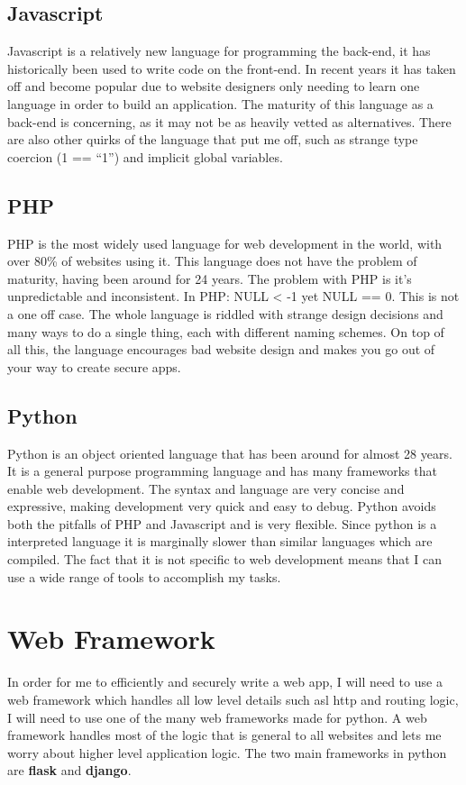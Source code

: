 \documentclass[12pt, draft]{report}
\begin{document}
	\subsection{Javascript}
	Javascript is a relatively new language for programming the back-end, it has historically been used to write code on the front-end. In recent years it has taken off and become popular due to website designers only needing to learn one language in order to build an application. The maturity of this language as a back-end is concerning, as it may not be as heavily vetted as alternatives. There are also other quirks of the language that put me off, such as strange type coercion (1 == “1”) and implicit global variables.

	\subsection{PHP}
	PHP is the most widely used language for web development in the world, with over 80\% of websites using it. This language does not have the problem of maturity, having been around for 24 years. The problem with PHP is it’s unpredictable and inconsistent. In PHP: NULL < -1 yet NULL == 0. This is not a one off case. The whole language is riddled with strange design decisions and many ways to do a single thing, each with different naming schemes. On top of all this, the language encourages bad website design and makes you go out of your way to create secure apps.

	\subsection{Python}
	Python is an object oriented language that has been around for almost 28 years. It is a general purpose programming language and has many frameworks that enable web development. The syntax and language are very concise and expressive, making development very quick and easy to debug. Python avoids both the pitfalls of PHP and Javascript and is very flexible. Since python is a interpreted language it is marginally slower than similar languages which are compiled. The fact that it is not specific to web development means that I can use a wide range of tools to accomplish my tasks.

	\section{Web Framework}
	In order for me to efficiently and securely write a web app, I will need to use a web framework which handles all low level details such asl http and routing logic, I will need to use one of the many web frameworks made for python. A web framework handles most of the logic that is general to all websites and lets me worry about higher level application logic. The two main frameworks in python are \textbf{flask} and \textbf{django}.
\end{document}
